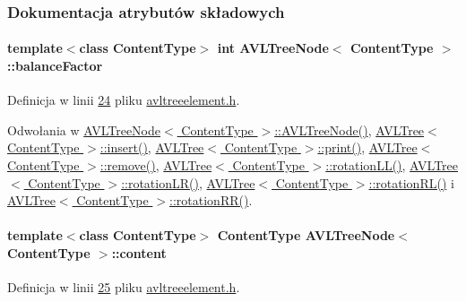 \subsubsection{Dokumentacja atrybutów składowych}
\hypertarget{class_a_v_l_tree_node_a212c57dab467b42c3ddc50b2aecc05ad}{
\paragraph[{balance\-Factor}]{\setlength{\rightskip}{0pt plus 5cm}template$<$class Content\-Type$>$ int {\bf A\-V\-L\-Tree\-Node}$<$ Content\-Type $>$\-::balance\-Factor}}\label{class_a_v_l_tree_node_a212c57dab467b42c3ddc50b2aecc05ad}


Definicja w linii \hyperlink{avltreeelement_8h_source_l00024}{24} pliku \hyperlink{avltreeelement_8h_source}{avltreeelement.\-h}.



Odwołania w \hyperlink{avltreeelement_8h_source_l00027}{A\-V\-L\-Tree\-Node$<$ Content\-Type $>$\-::\-A\-V\-L\-Tree\-Node()}, \hyperlink{avltree_8h_source_l00049}{A\-V\-L\-Tree$<$ Content\-Type $>$\-::insert()}, \hyperlink{avltree_8h_source_l00389}{A\-V\-L\-Tree$<$ Content\-Type $>$\-::print()}, \hyperlink{avltree_8h_source_l00289}{A\-V\-L\-Tree$<$ Content\-Type $>$\-::remove()}, \hyperlink{avltree_8h_source_l00166}{A\-V\-L\-Tree$<$ Content\-Type $>$\-::rotation\-L\-L()}, \hyperlink{avltree_8h_source_l00222}{A\-V\-L\-Tree$<$ Content\-Type $>$\-::rotation\-L\-R()}, \hyperlink{avltree_8h_source_l00195}{A\-V\-L\-Tree$<$ Content\-Type $>$\-::rotation\-R\-L()} i \hyperlink{avltree_8h_source_l00137}{A\-V\-L\-Tree$<$ Content\-Type $>$\-::rotation\-R\-R()}.

\hypertarget{class_a_v_l_tree_node_ac94089c8fd88ff9fbd092cd2306719bd}{
\paragraph[{content}]{\setlength{\rightskip}{0pt plus 5cm}template$<$class Content\-Type$>$ Content\-Type {\bf A\-V\-L\-Tree\-Node}$<$ Content\-Type $>$\-::content}}\label{class_a_v_l_tree_node_ac94089c8fd88ff9fbd092cd2306719bd}


Definicja w linii \hyperlink{avltreeelement_8h_source_l00025}{25} pliku \hyperlink{avltreeelement_8h_source}{avltreeelement.\-h}.

